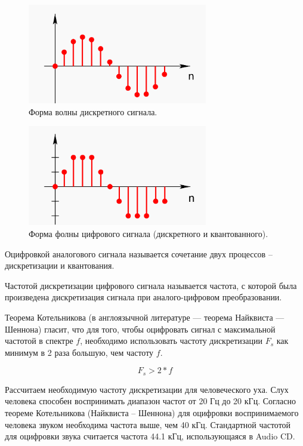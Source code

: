 \begin{figure}[H]
	\centering
	\includegraphics [width=0.7\textwidth] {images/lab_7/discrete.png}
	\caption{Форма волны дискретного сигнала.}
	\label{lab7:pic2}
\end{figure}


\begin{figure}[H]
	\centering
	\includegraphics [width=0.7\textwidth] {images/lab_7/digital.png}
	\caption{Форма фолны цифрового сигнала (дискретного и квантованного).}
	\label{lab7:pic3}
\end{figure}

Оцифровкой аналогового сигнала называется сочетание двух процессов -- дискретизации и квантования.

Частотой дискретизации цифрового сигнала называется частота, с которой была произведена дискретизация сигнала при аналого-цифровом преобразовании.

Теорема Котельникова (в англоязычной литературе — теорема Найквиста — Шеннона) гласит, что для того, чтобы оцифровать сигнал с максимальной частотой в спектре $f$, необходимо использовать частоту дискретизации $F_s$ как минимум в 2 раза большую, чем частоту $f$.

$$ F_s > 2*f $$

Рассчитаем необходимую частоту дискретизации для человеческого уха.
Слух человека способен воспринимать диапазон частот от 20 Гц до 20 кГц.
Согласно теореме Котельникова (Найквиста -- Шеннона) для оцифровки воспринимаемого человека звуком необходима частота выше, чем 40 кГц. Стандартной частотой для оцифровки звука считается частота 44.1 кГц, использующаяся в Audio CD.



